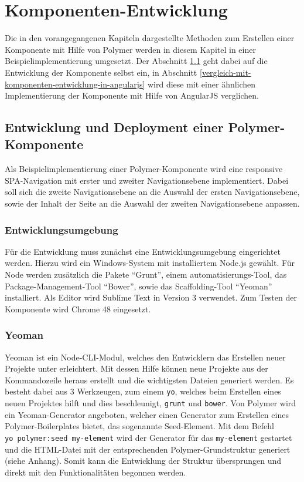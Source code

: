\chapter{Komponenten-Entwicklung}\label{komponenten-entwicklung}

Die in den vorangegangenen Kapiteln dargestellte Methoden zum Erstellen einer Komponente mit Hilfe von Polymer werden in diesem Kapitel in einer Beispielimplementierung umgesetzt. Der Abschnitt \ref{entwicklung-und-deployment-einer-polymer-komponente} geht dabei auf die Entwicklung der Komponente selbst ein, in Abschnitt \ref{vergleich-mit-komponenten-entwicklung-in-angularjs} wird diese mit einer ähnlichen Implementierung der Komponente mit Hilfe von AngularJS verglichen.


\section{Entwicklung und Deployment einer Polymer-Komponente}\label{entwicklung-und-deployment-einer-polymer-komponente}

Als Beispielimplementierung einer Polymer-Komponente wird eine responsive \ac{SPA}-Navigation mit erster und zweiter Navigationsebene implementiert. Dabei soll sich die zweite Navigationsebene an die Auswahl der ersten Navigationsebene, sowie der Inhalt der Seite an die Auswahl der zweiten Navigationsebene anpassen.


\subsection{Entwicklungsumgebung}\label{entwicklungsumgebung}

Für die Entwicklung muss zunächst eine Entwicklungsumgebung eingerichtet werden. Hierzu wird ein Windows-System mit installiertem Node.js gewählt. Für Node werden zusätzlich die Pakete ``Grunt'', einem automatisierungs-Tool, das Package-Management-Tool ``Bower'', sowie das Scaffolding-Tool ``Yeoman'' installiert. Als Editor wird Sublime Text in Version 3 verwendet. Zum Testen der Komponente wird Chrome 48 eingesetzt.


\subsection{Yeoman}\label{yeoman}

Yeoman \cite{citeulike:13916358} ist ein Node-\ac{CLI}-Modul, welches den Entwicklern das Erstellen neuer Projekte unter erleichtert. Mit dessen Hilfe können neue Projekte aus der Kommandozeile heraus erstellt und die wichtigsten Dateien generiert werden. Es besteht dabei aus 3 Werkzeugen, zum einem \texttt{yo}, welches beim Erstellen eines neuen Projektes hilft und dies beschleunigt, \texttt{grunt} und \texttt{bower}. Von Polymer wird ein Yeoman-Generator angeboten, welcher einen Generator zum Erstellen eines Polymer-Boilerplates bietet, das sogenannte Seed-Element. Mit dem Befehl \texttt{yo\ polymer:seed\ my-element} wird der Generator für das \texttt{my-element} gestartet und die \ac{HTML}-Datei mit der entsprechenden Polymer-Grundstruktur generiert (siehe Anhang). Somit kann die Entwicklung der Struktur übersprungen und direkt mit den Funktionalitäten begonnen werden.


